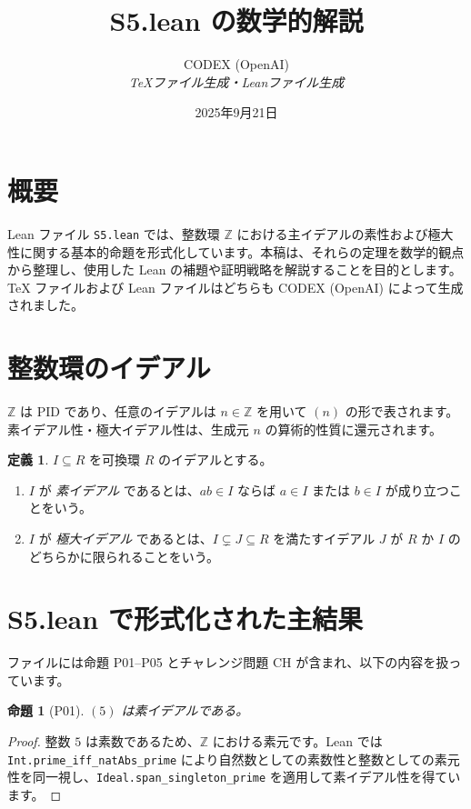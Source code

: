 \documentclass[12pt]{ltjsarticle}
\title{\textbf{S5.lean の数学的解説}}
\author{CODEX (OpenAI)\\\textit{TeXファイル生成・Leanファイル生成}}
\date{2025年9月21日}
\theoremstyle{definition}
\newtheorem{definition}{定義}
\theoremstyle{plain}
\newtheorem{proposition}{命題}
\theoremstyle{remark}
\begin{document}
\maketitle

\section{概要}
Lean ファイル \texttt{S5.lean} では、整数環 $\mathbb{Z}$ における主イデアルの素性および極大性に関する基本的命題を形式化しています。本稿は、それらの定理を数学的観点から整理し、使用した Lean の補題や証明戦略を解説することを目的とします。TeX ファイルおよび Lean ファイルはどちらも CODEX (OpenAI) によって生成されました。

\section{整数環のイデアル}
$\mathbb{Z}$ は PID であり、任意のイデアルは $n \in \mathbb{Z}$ を用いて $(n)$ の形で表されます。素イデアル性・極大イデアル性は、生成元 $n$ の算術的性質に還元されます。

\begin{definition}
$I \subseteq R$ を可換環 $R$ のイデアルとする。
\begin{enumerate}
  \item $I$ が \emph{素イデアル} であるとは、$ab \in I$ ならば $a \in I$ または $b \in I$ が成り立つことをいう。
  \item $I$ が \emph{極大イデアル} であるとは、$I \subsetneq J \subseteq R$ を満たすイデアル $J$ が $R$ か $I$ のどちらかに限られることをいう。
\end{enumerate}
\end{definition}

\section{S5.lean で形式化された主結果}
ファイルには命題 P01--P05 とチャレンジ問題 CH が含まれ、以下の内容を扱っています。

\begin{proposition}[P01]
$(5)$ は素イデアルである。
\end{proposition}
\begin{proof}
整数 $5$ は素数であるため、$\mathbb{Z}$ における素元です。Lean では \texttt{Int.prime\_iff\_natAbs\_prime} により自然数としての素数性と整数としての素元性を同一視し、\texttt{Ideal.span\_singleton\_prime} を適用して素イデアル性を得ています。
\end{proof}
\end{document}
